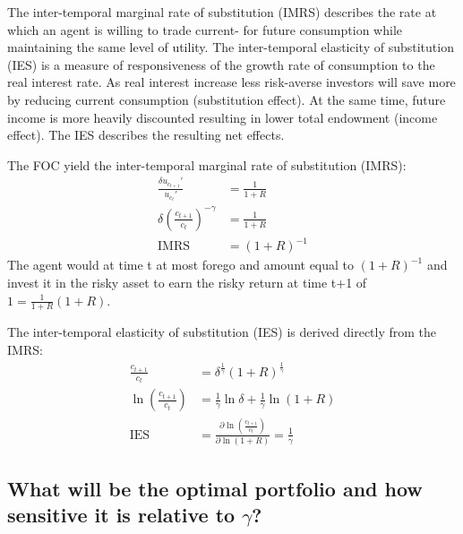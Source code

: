 \documentclass[12pt]{article}
\begin{document}
	The inter-temporal marginal rate of substitution (IMRS) describes the rate at which an agent is willing to trade current- for future consumption while maintaining the same level of utility. The inter-temporal elasticity of substitution (IES) is a measure of responsiveness of the growth rate of consumption to the real interest rate. As real interest increase less risk-averse investors will save more by reducing current consumption (substitution effect). At the same time, future income is more heavily discounted resulting in lower total endowment (income effect). The IES describes the resulting net effects.
	
	The FOC yield the inter-temporal marginal rate of substitution (IMRS):
	\begin{align*}
		\frac{\delta u_{c_{t+1}}'}{u_{c_t}'} &= \frac{1}{1+R}\\
		\delta \left( \frac{c_{t+1}}{c_t} \right)^{-\gamma} &= \frac{1}{1+R}\\
		\text{IMRS} &= (1+R)^{-1}
	\end{align*}
	The agent would at time t at most forego and amount equal to $(1+R)^{-1}$ and invest it in the risky asset to earn the risky return at time t+1 of $1 = \frac{1}{1+R}(1+R)$. 
	
	The inter-temporal elasticity of substitution (IES) is derived directly from the IMRS:
	\begin{align*}
		\frac{c_{t+1}}{c_t} &= \delta^{\frac{1}{\gamma}}(1+R)^{\frac{1}{\gamma}}\\
		\ln \left(\frac{c_{t+1}}{c_t}\right) &= \frac{1}{\gamma} \ln \delta + \frac{1}{\gamma} \ln (1+R)\\
		\text{IES} &= \frac{\partial \ln (\frac{c_{t+1}}{c_t})}{\partial\ln (1+R)} = \frac{1}{\gamma}
	\end{align*}
	
	\subsection{What will be the optimal portfolio and how sensitive it is relative to $\gamma$?}
\end{document}
